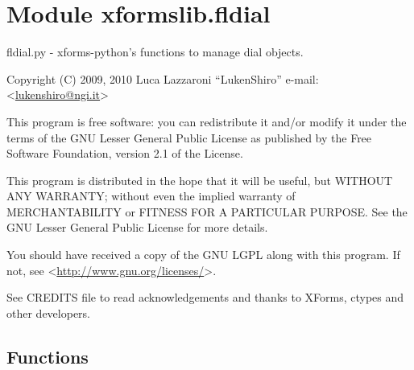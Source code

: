 %
%
%


\section{Module xformslib.fldial}

    \label{xformslib:fldial}

fldial.py - xforms-python's functions to manage dial objects.

Copyright (C) 2009, 2010  Luca Lazzaroni ``LukenShiro''
e-mail: <\href{mailto:lukenshiro@ngi.it}{lukenshiro@ngi.it}>

This program is free software: you can redistribute it and/or modify
it under the terms of the GNU Lesser General Public License as
published by the Free Software Foundation, version 2.1 of the License.

This program is distributed in the hope that it will be useful,
but WITHOUT ANY WARRANTY; without even the implied warranty of
MERCHANTABILITY or FITNESS FOR A PARTICULAR PURPOSE. See the
GNU Lesser General Public License for more details.

You should have received a copy of the GNU LGPL along with this
program. If not, see <\href{http://www.gnu.org/licenses/}{http://www.gnu.org/licenses/}>.

See CREDITS file to read acknowledgements and thanks to XForms,
ctypes and other developers.


  \subsection{Functions}

    \label{xformslib:fldial:fl_add_dial}

